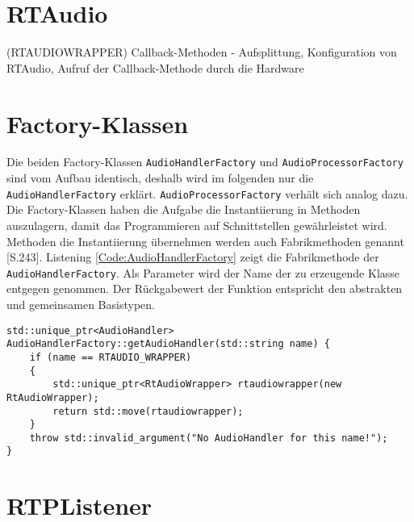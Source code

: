 \section{RTAudio}
(RTAUDIOWRAPPER) Callback-Methoden - Aufsplittung, Konfiguration von RTAudio, Aufruf der Callback-Methode durch die Hardware


\section{Factory-Klassen}
Die beiden Factory-Klassen \texttt{AudioHandlerFactory} und \texttt{AudioProcessorFactory} sind vom Aufbau identisch, deshalb wird im folgenden nur die \texttt{AudioHandlerFactory} erklärt. \texttt{AudioProcessorFactory} verhält sich analog dazu. Die Factory-Klassen haben die Aufgabe die Instantiierung in Methoden auszulagern, damit das Programmieren auf Schnittstellen gewährleistet wird. Methoden die Instantiierung übernehmen werden auch Fabrikmethoden genannt \cite{Goll2013}[S.243]. Listening \ref{Code:AudioHandlerFactory} zeigt die Fabrikmethode der \texttt{AudioHandlerFactory}. Als Parameter wird der Name der zu erzeugende Klasse entgegen genommen. Der Rückgabewert der Funktion entspricht den abstrakten und gemeinsamen Basistypen.

\begin{lstlisting}[caption={Fabrikmethode der AudioHandlerFactory},label={Code:AudioHandlerFactory}]
std::unique_ptr<AudioHandler> AudioHandlerFactory::getAudioHandler(std::string name) {
	if (name == RTAUDIO_WRAPPER)
	{
		std::unique_ptr<RtAudioWrapper> rtaudiowrapper(new RtAudioWrapper);
		return std::move(rtaudiowrapper);
	}
	throw std::invalid_argument("No AudioHandler for this name!");
}
\end{lstlisting}



\section{RTPListener}

